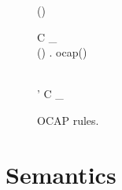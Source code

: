 \begin{figure}
  {\ocap{(\AnyRefType{})}}

  \RuleSpace{}

  {\ocap(\CellType)}

  \RuleSpace{}

  { \andalso C \vdash_{\ocap}  \\
  \forall () \in {}. \: ocap(\sigma)}
  {}

  \RuleSpace{}

  { \\
  \tau' \stof \tau}
  {C \vdash_{\ocap} }
  \caption{\RACL{} OCAP rules.}
  \label{fig:ocap_typing}
\end{figure}


\section{Semantics}
\label{sec:semantics}

